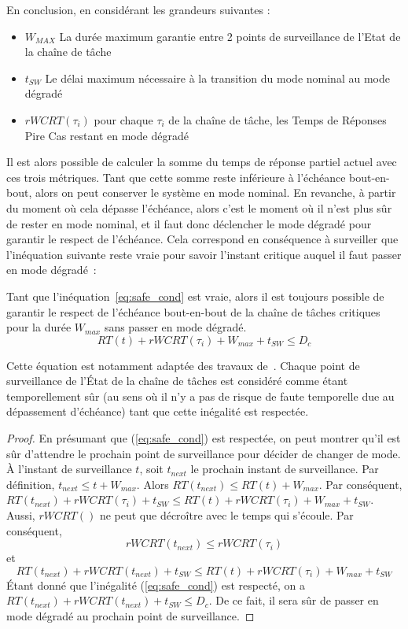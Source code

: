 \documentclass[french, a4paper, 11pt, twoside, pdftex]{StyleThese}
\begin{document}
	En conclusion, en considérant les grandeurs suivantes : 
	\begin{itemize}
		\item 	$ W_{MAX} $ La durée maximum garantie entre 2 points de surveillance de l'Etat de la chaîne de tâche
		\item 	$ t_{SW} $ Le délai maximum nécessaire à la transition du mode nominal au mode dégradé
		\item 	$ rWCRT(\tau_i) $ pour chaque $\tau_i$ de la chaîne de tâche, les Temps de Réponses Pire Cas restant en mode dégradé
	\end{itemize}
	Il est alors possible de calculer la somme du temps de réponse partiel actuel avec ces trois métriques. Tant que cette somme reste inférieure à l'échéance bout-en-bout, alors on peut conserver le système en mode nominal. En revanche, à partir du moment où cela dépasse l'échéance, alors c'est le moment où il n'est plus sûr de rester en mode nominal, et il faut donc déclencher le mode dégradé pour garantir le respect de l'échéance. Cela correspond en conséquence à surveiller que l'inéquation suivante reste vraie pour savoir l'instant critique auquel il faut passer en mode dégradé~:
	
	\begin{theorem}
		Tant que l'inéquation~\ref{eq:safe_cond} est vraie, alors il est toujours possible de garantir le respect de l'échéance bout-en-bout de la chaîne de tâches critiques pour la durée $W_{max}$ sans passer en mode dégradé.
		\begin{equation} \label{eq:safe_cond}
			RT(t) + rWCRT(\tau_i) + W_{max} + t_{SW} \leq D_c
		\end{equation} 
	\end{theorem}

	Cette équation est notamment adaptée des travaux de~\cite{kritikakou_run-time_2014}. Chaque point de surveillance de l'État de la chaîne de tâches est considéré comme étant temporellement sûr (au sens où il n'y a pas de risque de faute temporelle due au dépassement d'échéance) tant que cette inégalité est respectée.
    
    \begin{proof}
		En présumant que (\ref{eq:safe_cond}) est respectée, on peut montrer qu'il est sûr d'attendre le prochain point de surveillance pour décider de changer de mode. \nline
		À l'instant de surveillance $t$, soit $t_{next}$ le prochain instant de surveillance.\nline
		Par définition, $t_{next} \leq t + W_{max}$. Alors $RT(t_{next}) \leq RT(t) + W_{max}$. 
		Par conséquent, \smallbreak
		$RT(t_{next}) + rWCRT(\tau_i) + t_{SW} \leq RT(t) + rWCRT(\tau_i) + W_{max} + t_{SW}$. \nline
		Aussi, $rWCRT()$ ne peut que décroître avec le temps qui s'écoule. Par conséquent, %
		\[ rWCRT(t_{next}) \leq rWCRT(\tau_i)	\]
		et 
		\[ RT(t_{next}) + rWCRT(t_{next}) + t_{SW} \leq RT(t) + rWCRT(\tau_i) + W_{max} + t_{SW} \] 
		Étant donné que l'inégalité (\ref{eq:safe_cond}) est respecté, on a $RT(t_{next}) + rWCRT(t_{next}) + t_{SW} \leq D_c$.
		De ce fait, il sera sûr de passer en mode dégradé au prochain point de surveillance.  
    \end{proof}
    
\end{document}
